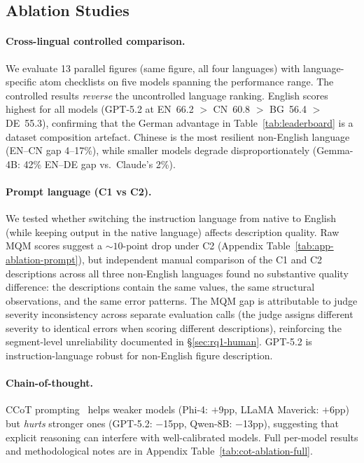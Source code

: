 \subsection{Ablation Studies}\label{sec:rq1-ablations}

\paragraph{Cross-lingual controlled comparison.}
We evaluate 13 parallel figures (same figure, all four languages) with language-specific atom checklists on five models spanning the performance range.
The controlled results \emph{reverse} the uncontrolled language ranking. English scores highest for all models (GPT-5.2 at EN~66.2 $>$ CN~60.8 $>$ BG~56.4 $>$ DE~55.3), confirming that the German advantage in Table~\ref{tab:leaderboard} is a dataset composition artefact.
Chinese is the most resilient non-English language (EN--CN gap 4--17\%), while smaller models degrade disproportionately (Gemma-4B: 42\% EN--DE gap vs.\ Claude's 2\%).

\paragraph{Prompt language (C1 vs C2).}
We tested whether switching the instruction language from native to English (while keeping output in the native language) affects description quality.
Raw MQM scores suggest a ${\sim}10$-point drop under C2 (Appendix Table~\ref{tab:app-ablation-prompt}), but independent manual comparison of the C1 and C2 descriptions across all three non-English languages found no substantive quality difference: the descriptions contain the same values, the same structural observations, and the same error patterns.
The MQM gap is attributable to judge severity inconsistency across separate evaluation calls (the judge assigns different severity to identical errors when scoring different descriptions), reinforcing the segment-level unreliability documented in \S\ref{sec:rq1-human}.
GPT-5.2 is instruction-language robust for non-English figure description.

\paragraph{Chain-of-thought.}
CCoT prompting~\citep{mitra2024ccot} helps weaker models (Phi-4: $+$9pp, LLaMA Maverick: $+$6pp) but \emph{hurts} stronger ones (GPT-5.2: $-$15pp, Qwen-8B: $-$13pp), suggesting that explicit reasoning can interfere with well-calibrated models.
Full per-model results and methodological notes are in Appendix Table~\ref{tab:cot-ablation-full}.

